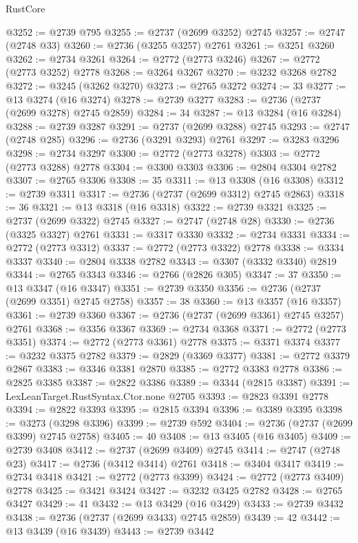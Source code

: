 \begin{lexlean}{RustCore}
\begin{coremodule}
@3252 := @2739 @795
@3255 := @2737 (@2699 @3252) @2745
@3257 := @2747 (@2748 @33)
@3260 := @2736 (@3255 @3257) @2761
@3261 := @3251 @3260
@3262 := @2734 @3261
@3264 := @2772 (@2773 @3246)
@3267 := @2772 (@2773 @3252) @2778
@3268 := @3264 @3267
@3270 := @3232 @3268 @2782
@3272 := @3245 (@3262 @3270)
@3273 := @2765 @3272
@3274 := 33
@3277 := @13 @3274 (@16 @3274)
@3278 := @2739 @3277
@3283 := @2736 (@2737 (@2699 @3278) @2745 @2859)
@3284 := 34
@3287 := @13 @3284 (@16 @3284)
@3288 := @2739 @3287
@3291 := @2737 (@2699 @3288) @2745
@3293 := @2747 (@2748 @285)
@3296 := @2736 (@3291 @3293) @2761
@3297 := @3283 @3296
@3298 := @2734 @3297
@3300 := @2772 (@2773 @3278)
@3303 := @2772 (@2773 @3288) @2778
@3304 := @3300 @3303
@3306 := @2804 @3304 @2782
@3307 := @2765 @3306
@3308 := 35
@3311 := @13 @3308 (@16 @3308)
@3312 := @2739 @3311
@3317 := @2736 (@2737 (@2699 @3312) @2745 @2863)
@3318 := 36
@3321 := @13 @3318 (@16 @3318)
@3322 := @2739 @3321
@3325 := @2737 (@2699 @3322) @2745
@3327 := @2747 (@2748 @28)
@3330 := @2736 (@3325 @3327) @2761
@3331 := @3317 @3330
@3332 := @2734 @3331
@3334 := @2772 (@2773 @3312)
@3337 := @2772 (@2773 @3322) @2778
@3338 := @3334 @3337
@3340 := @2804 @3338 @2782
@3343 := @3307 (@3332 @3340) @2819
@3344 := @2765 @3343
@3346 := @2766 (@2826 @305)
@3347 := 37
@3350 := @13 @3347 (@16 @3347)
@3351 := @2739 @3350
@3356 := @2736 (@2737 (@2699 @3351) @2745 @2758)
@3357 := 38
@3360 := @13 @3357 (@16 @3357)
@3361 := @2739 @3360
@3367 := @2736 (@2737 (@2699 @3361) @2745 @3257) @2761
@3368 := @3356 @3367
@3369 := @2734 @3368
@3371 := @2772 (@2773 @3351)
@3374 := @2772 (@2773 @3361) @2778
@3375 := @3371 @3374
@3377 := @3232 @3375 @2782
@3379 := @2829 (@3369 @3377)
@3381 := @2772 @3379 @2867
@3383 := @3346 @3381 @2870
@3385 := @2772 @3383 @2778
@3386 := @2825 @3385
@3387 := @2822 @3386
@3389 := @3344 (@2815 @3387)
@3391 := LexLeanTarget.RustSyntax.Ctor.none @2705
@3393 := @2823 @3391 @2778
@3394 := @2822 @3393
@3395 := @2815 @3394
@3396 := @3389 @3395
@3398 := @3273 (@3298 @3396)
@3399 := @2739 @592
@3404 := @2736 (@2737 (@2699 @3399) @2745 @2758)
@3405 := 40
@3408 := @13 @3405 (@16 @3405)
@3409 := @2739 @3408
@3412 := @2737 (@2699 @3409) @2745
@3414 := @2747 (@2748 @23)
@3417 := @2736 (@3412 @3414) @2761
@3418 := @3404 @3417
@3419 := @2734 @3418
@3421 := @2772 (@2773 @3399)
@3424 := @2772 (@2773 @3409) @2778
@3425 := @3421 @3424
@3427 := @3232 @3425 @2782
@3428 := @2765 @3427
@3429 := 41
@3432 := @13 @3429 (@16 @3429)
@3433 := @2739 @3432
@3438 := @2736 (@2737 (@2699 @3433) @2745 @2859)
@3439 := 42
@3442 := @13 @3439 (@16 @3439)
@3443 := @2739 @3442

\end{coremodule}
\end{lexlean}
